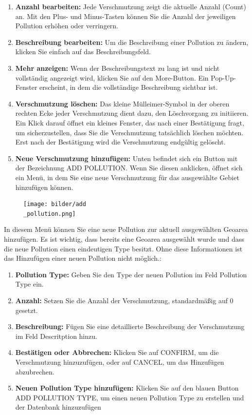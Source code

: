 \documentclass[a4paper,12pt]{article}
\begin{document}
\begin{enumerate}
    \item \textbf{Anzahl bearbeiten:} Jede Verschmutzung zeigt die aktuelle Anzahl (Count) an. Mit den Plus- und Minus-Tasten können Sie die Anzahl der jeweiligen Pollution erhöhen oder verringern.
    \item \textbf{Beschreibung bearbeiten:} Um die Beschreibung einer Pollution zu ändern, klicken Sie einfach auf das Beschreibungsfeld. 
    \item \textbf{Mehr anzeigen:} Wenn der Beschreibungstext zu lang ist und nicht vollständig angezeigt wird, klicken Sie auf den \glqq More\grqq{}-Button. Ein Pop-Up-Fenster erscheint, in dem die vollständige Beschreibung sichtbar ist.
   \item \textbf{Verschmutzung löschen:} Das kleine Mülleimer-Symbol in der oberen rechten Ecke jeder Verschmutzung dient dazu, den Löschvorgang zu initiieren. Ein Klick darauf öffnet ein kleines Fenster, das nach einer Bestätigung fragt, um sicherzustellen, dass Sie die Verschmutzung tatsächlich löschen möchten. Erst nach der Bestätigung wird die Verschmutzung endgültig gelöscht.
    \item \textbf{Neue Verschmutzung hinzufügen:} Unten befindet sich ein Button mit der Bezeichnung \glqq ADD POLLUTION\grqq{}. Wenn Sie diesen anklicken, öffnet sich ein Menü, in dem Sie eine neue Verschmutzung für das ausgewählte Gebiet hinzufügen können.
\end{enumerate}

\begin{figure}[h]
\centering
\texttt{[image: bilder/add\\\_pollution.png]}
\end{figure}

\noindent In diesem Menü können Sie eine neue Pollution zur aktuell ausgewählten Geoarea hinzufügen. Es ist wichtig, dass bereits eine Geoarea ausgewählt wurde und dass die neue Pollution einen eindeutigen Type besitzt. Ohne diese Informationen ist das Hinzufügen einer neuen Pollution nicht möglich.:
\begin{enumerate}
    \item \textbf{Pollution Type:} Geben Sie den Type der neuen Pollution im Feld \glqq Pollution Type\grqq{} ein.
    \item \textbf{Anzahl:} Setzen Sie die Anzahl der Verschmutzung, standardmäßig auf 0 gesetzt.
    \item \textbf{Beschreibung:} Fügen Sie eine detaillierte Beschreibung der Verschmutzung im Feld \glqq Descritption\grqq{} hinzu.
    \item \textbf{Bestätigen oder Abbrechen:} Klicken Sie auf \glqq CONFIRM\grqq{}, um die Verschmutzung hinzuzufügen, oder auf \glqq CANCEL\grqq{}, um das Hinzufügen abzubrechen.
    \item\textbf{Neuen Pollution Type hinzufügen:} Klicken Sie auf den blauen Button \glqq ADD POLLUTION TYPE\grqq{}, um einen neuen Pollution Type zu erstellen und der Datenbank hinzuzufügen
\end{enumerate}
\end{document}
